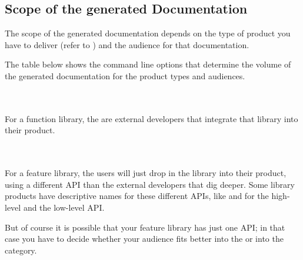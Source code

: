
\subsection{Scope of the generated Documentation}\label{sec:GenerationScope}
The scope of the generated documentation depends on the type of product you have to deliver (refer to ) and the audience for that documentation.

The table below shows the command line options that determine the volume of the generated documentation for the product types and audiences.

\paragraph{}\

\renewcommand{\cellalign}{tl}

For a function library, the  are external developers that integrate that library into their product.

\paragraph{}\

\renewcommand{\cellalign}{tl}

For a feature library, the users will just drop in the library into their product, using a different API than the external developers that dig deeper. Some library products have descriptive names for these different APIs, like  and  for the high-level and the low-level API.

But of course it is possible that your feature library has just one API; in that case you have to decide whether your audience fits better into the  or into the  category.

\paragraph{}\

\renewcommand{\cellalign}{tl}

